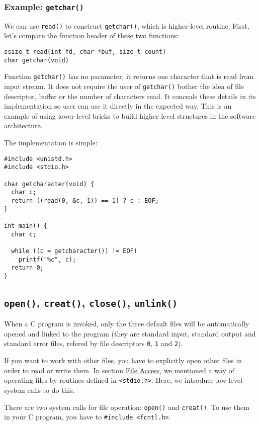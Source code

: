 \documentclass[12pt]{article}
\begin{document}
\subsubsection{Example: \texttt{getchar()}}
\label{sec:org9fb5129}
We can use \texttt{read()} to construct \texttt{getchar()}, which is higher-level routine. First, let's compare the function header of these two functions:
\begin{verbatim}
ssize_t read(int fd, char *buf, size_t count)
char getchar(void)
\end{verbatim}
Function \texttt{getchar()} has no parameter, it returns one character that is read from input stream. It does not require the user of \texttt{getchar()} bother the idea of file descriptor, buffer or the number of characters read. It conceals these details in its implementation so user can use it directly in the expected way. This is an example of using lower-level bricks to build higher level structures in the software architecture.

The implementation is simple:
\begin{verbatim}
#include <unistd.h>
#include <stdio.h>

char getcharacter(void) {
  char c;
  return ((read(0, &c, 1)) == 1) ? c : EOF;
}

int main() {
  char c;

  while ((c = getcharacter()) != EOF)
    printf("%c", c);
  return 0;
}
\end{verbatim}
\subsection{\texttt{open()}, \texttt{creat()}, \texttt{close()}, \texttt{unlink()}}
\label{sec:org67bf4cb}
When a C program is invoked, only the three default files will be automatically opened and linked to the program (they are standard input, standard output and standard error files, refered by file descriptors \texttt{0}, \texttt{1} and \texttt{2}).

If you want to work with other files, you have to explicitly open other files in order to read or write them. In section \hyperref[org7afd198]{File Access}, we mentioned a way of operating files by routines defined in \texttt{<stdio.h>}. Here, we introduce low-level system calls to do this.

There are two system calls for file operation: \texttt{open()} and \texttt{creat()}. To use them in your C program, you have to \texttt{\#include <fcntl.h>}.
\end{document}
